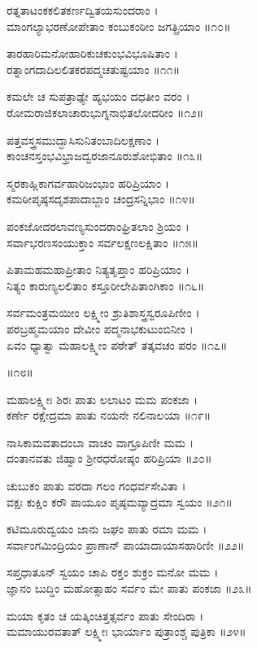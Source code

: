 ರತ್ನತಾಟಂಕಕಲಿತಕರ್ಣದ್ವಿತಯಸುಂದರಾಂ ।\\
ಮಾಂಗಲ್ಯಾಭರಣೋಪೇತಾಂ ಕಂಬುಕಂಠೀಂ ಜಗತ್ಪ್ರಿಯಾಂ ॥೧೦॥

ತಾರಹಾರಿಮನೋಹಾರಿಕುಚಕುಂಭವಿಭೂಷಿತಾಂ ।\\
ರತ್ನಾಂಗದಾದಿಲಲಿತಕರಪದ್ಮಚತುಷ್ಟಯಾಂ ॥೧೧॥

ಕಮಲೇ ಚ ಸುಪತ್ರಾಢ್ಯೇ ಹ್ಯಭಯಂ ದಧತೀಂ ವರಂ ।\\
ರೋಮರಾಜಿಕಲಾಚಾರುಭುಗ್ನನಾಭಿತಲೋದರೀಂ ॥೧೨॥

ಪತ್ತವಸ್ತ್ರಸಮುದ್ಭಾಸಿಸುನಿತಂಬಾದಿಲಕ್ಷಣಾಂ ।\\
ಕಾಂಚನಸ್ತಂಭವಿಭ್ರಾಜದ್ವರಜಾನೂರುಶೋಭಿತಾಂ ॥೧೩॥

ಸ್ಮರಕಾಹ್ಲಿಕಾಗರ್ವಹಾರಿಜಂಭಾಂ ಹರಿಪ್ರಿಯಾಂ ।\\
ಕಮಠೀಪೃಷ್ಠಸದೃಶಪಾದಾಬ್ಜಾಂ ಚಂದ್ರಸನ್ನಿಭಾಂ ॥೧೪॥

ಪಂಕಜೋದರಲಾವಣ್ಯಸುಂದರಾಂಘ್ರಿತಲಾಂ ಶ್ರಿಯಂ ।\\
ಸರ್ವಾಭರಣಸಂಯುಕ್ತಾಂ ಸರ್ವಲಕ್ಷಣಲಕ್ಷಿತಾಂ ॥೧೫॥

ಪಿತಾಮಹಮಹಾಪ್ರೀತಾಂ ನಿತ್ಯತೃಪ್ತಾಂ ಹರಿಪ್ರಿಯಾಂ ।\\
ನಿತ್ಯಂ ಕಾರುಣ್ಯಲಲಿತಾಂ ಕಸ್ತೂರೀಲೇಪಿತಾಂಗಿಕಾಂ ॥೧೬॥

ಸರ್ವಮಂತ್ರಮಯೀಂ ಲಕ್ಷ್ಮೀಂ ಶ್ರುತಿಶಾಸ್ತ್ರಸ್ವರೂಪಿಣೀಂ ।\\
ಪರಬ್ರಹ್ಮಮಯಾಂ ದೇವೀಂ ಪದ್ಮನಾಭಕುಟುಂಬಿನೀಂ ।\\
ಏವಂ ಧ್ಯಾತ್ವಾ ಮಹಾಲಕ್ಷ್ಮೀಂ ಪಠೇತ್ ತತ್ಕವಚಂ ಪರಂ ॥೧೭॥

 ॥೧೮॥

ಮಹಾಲಕ್ಷ್ಮೀಃ ಶಿರಃ ಪಾತು ಲಲಾಟಂ ಮಮ ಪಂಕಜಾ ।\\
ಕರ್ಣೇ ರಕ್ಷೇದ್ರಮಾ ಪಾತು ನಯನೇ ನಲಿನಾಲಯಾ ॥೧೯॥

ನಾಸಿಕಾಮವತಾದಂಬಾ ವಾಚಂ ವಾಗ್ರೂಪಿಣೀ ಮಮ ।\\
ದಂತಾನವತು ಜಿಹ್ವಾಂ ಶ್ರೀರಧರೋಷ್ಠಂ ಹರಿಪ್ರಿಯಾ ॥೨೦॥

ಚುಬುಕಂ ಪಾತು ವರದಾ ಗಲಂ ಗಂಧರ್ವಸೇವಿತಾ ।\\
ವಕ್ಷಃ ಕುಕ್ಷಿಂ ಕರೌ ಪಾಯೂಂ ಪೃಷ್ಠಮವ್ಯಾದ್ರಮಾ ಸ್ವಯಂ ॥೨೧॥

ಕಟಿಮೂರುದ್ವಯಂ ಜಾನು ಜಘಂ ಪಾತು ರಮಾ ಮಮ ।\\
ಸರ್ವಾಂಗಮಿಂದ್ರಿಯಂ ಪ್ರಾಣಾನ್ ಪಾಯಾದಾಯಾಸಹಾರಿಣೀ ॥೨೨॥

ಸಪ್ತಧಾತೂನ್ ಸ್ವಯಂ ಚಾಪಿ ರಕ್ತಂ ಶುಕ್ರಂ ಮನೋ ಮಮ ।\\
ಜ್ಞಾನಂ ಬುದ್ಧಿಂ ಮಹೋತ್ಸಾಹಂ ಸರ್ವಂ ಮೇ ಪಾತು ಪಂಕಜಾ ॥೨೩॥

ಮಯಾ ಕೃತಂ ಚ ಯತ್ಕಿಂಚಿತ್ತತ್ಸರ್ವಂ ಪಾತು ಸೇಂದಿರಾ ।\\
ಮಮಾಯುರವತಾತ್ ಲಕ್ಷ್ಮೀಃ ಭಾರ್ಯಾಂ ಪುತ್ರಾಂಶ್ಚ ಪುತ್ರಿಕಾ ॥೨೪॥

